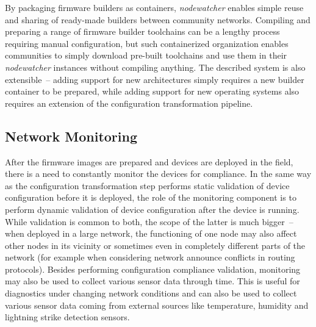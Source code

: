\documentclass[5p,sort&compress]{elsarticle}
\newcommand{\nodewatcher}{\textit{nodewatcher}}
\begin{document}
By packaging firmware builders as containers, \nodewatcher{} enables simple reuse and sharing of ready-made builders between community networks.
Compiling and preparing a range of firmware builder toolchains can be a lengthy process requiring manual configuration, but such containerized organization enables communities to simply download pre-built toolchains and use them in their \nodewatcher{} instances without compiling anything. The described system is also extensible~-- adding support for new architectures simply requires a new builder container to be prepared, while adding support for new operating systems also requires an extension of the configuration transformation pipeline.

\subsection{Network Monitoring}
\label{sec:network-monitoring}

After the firmware images are prepared and devices are deployed in the field, there is a need to constantly monitor the devices for compliance.
In the same way as the configuration transformation step performs static validation of device configuration before it is deployed, the role of the monitoring component is to perform dynamic validation of device configuration after the device is running.
While validation is common to both, the scope of the latter is much bigger~-- when deployed in a large network, the functioning of one node may also affect other nodes in its vicinity or sometimes even in completely different parts of the network (for example when considering network announce conflicts in routing protocols).
Besides performing configuration compliance validation, monitoring may also be used to collect various sensor data through time.
This is useful for diagnostics under changing network conditions and can also be used to collect various sensor data coming from external sources like temperature, humidity and lightning strike detection sensors.
\end{document}
